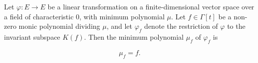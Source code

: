 Let $\varphi: E \to E$ be a linear transformation on a finite-dimensional vector space over a field of characteristic $0$, with minimum polynomial $\mu$. Let $f \in \Gamma[t]$ be a non-zero monic polynomial dividing $\mu$, and let $\varphi_f$ denote the restriction of $\varphi$ to the invariant subspace $K(f)$. Then the minimum polynomial $\mu_f$ of $\varphi_f$ is

$$\mu_f = f.$$
